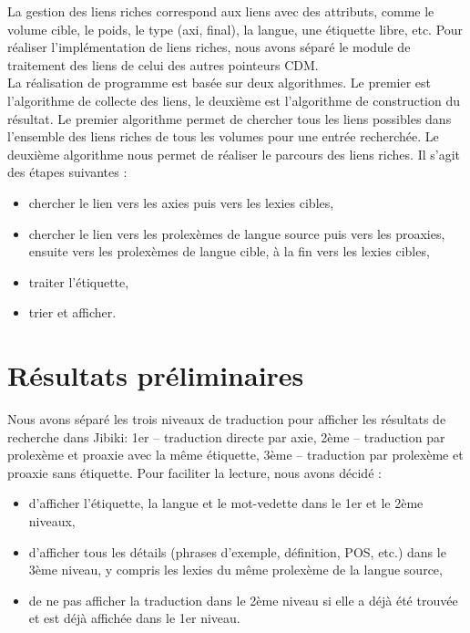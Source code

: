 \documentclass[10pt,a4paper,twoside]{article}
\begin{document}
La gestion des liens riches correspond aux liens avec des attributs, comme le volume cible, le poids, le type (axi, final), la langue, une étiquette libre, etc. Pour réaliser l'implémentation de liens riches, nous avons séparé le module de traitement des liens de celui des autres pointeurs CDM. \\
La réalisation de programme est basée sur deux algorithmes. Le premier est l'algorithme de collecte des liens, le deuxième est l'algorithme de construction du résultat.  Le premier algorithme permet de chercher tous les liens possibles dans l'ensemble des liens riches de tous les volumes pour une entrée recherchée. Le deuxième algorithme nous permet de réaliser le parcours des liens riches. Il s'agit des étapes suivantes :
\begin{itemize}
\item chercher le lien vers les axies puis vers les lexies cibles,
\item chercher le lien vers les prolexèmes de langue source puis vers les proaxies, ensuite vers les prolexèmes de langue cible, à la fin vers les lexies cibles,
\item traiter l'étiquette,
\item trier et afficher.
\end{itemize}


\section{Résultats préliminaires}

Nous avons séparé les trois niveaux de traduction pour afficher les résultats de recherche dans Jibiki: 1er – traduction directe par axie, 2ème – traduction par prolexème et proaxie avec la même étiquette, 3ème – traduction par prolexème et proaxie sans étiquette.  Pour faciliter la lecture, nous avons décidé :
\begin{itemize}
\item d'afficher l'étiquette, la langue et le mot-vedette dans le 1er et le 2ème niveaux, 
\item d'afficher tous les détails (phrases d'exemple, définition, POS, etc.) dans le 3ème niveau, y compris les lexies du même prolexème de la langue source,
\item de ne pas afficher la traduction dans le 2ème niveau si elle a déjà été trouvée et est déjà affichée dans le 1er niveau.
\end{itemize}
\end{document}
